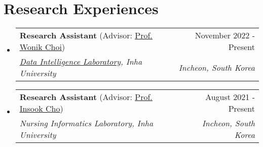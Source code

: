 \documentclass[letterpaper,11pt]{article}
\makeatletter
\newcommand{\resumeSubheading}[4]{
  \vspace{-1pt}\item
    \begin{tabular*}{0.97\textwidth}{l@{\extracolsep{\fill}}r}
      #1 & #2 \\
      \textit{\small#3} & \textit{\small #4} \\
    \end{tabular*}\vspace{-5pt}
}
\makeatother
\begin{document}
    \section{Research Experiences}
    \begin{itemize}[leftmargin=*,label=]
        \resumeSubheading
        {\textbf{Research Assistant} (Advisor: \underline{\href{http://bit.ly/3zSrQ8F}{Prof. Wonik Choi}})}{November 2022 - Present}
            {\href{http://dilab.inha.ac.kr/}{Data Intelligence Laboratory}, Inha University}{Incheon, South Korea}
        \resumeSubheading
        {\textbf{Research Assistant} (Advisor: \underline{\href{http://bit.ly/412nYOw}{Prof. Insook Cho}})}{August 2021 - Present}
            {Nursing Informatics Laboratory, Inha University}{Incheon, South Korea}
    \end{itemize}
    
\end{document}
